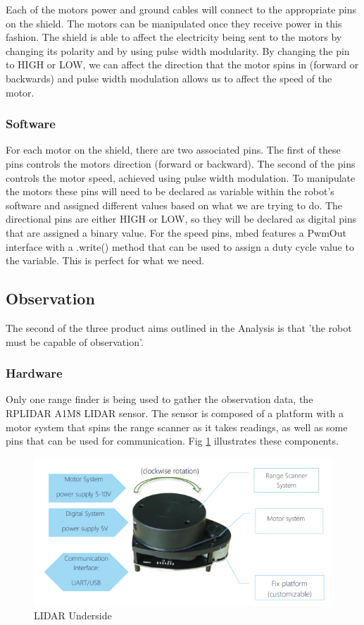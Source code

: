 				Each of the motors power and ground cables will connect to the appropriate pins on the shield. The motors can be manipulated once they receive power in this fashion. The shield is able to affect the electricity being sent to the motors by changing its polarity and by using pulse width modularity. By changing the pin to HIGH or LOW, we can affect the direction that the motor spins in (forward or backwards) and pulse width modulation allows us to affect the speed of the motor.
				
				\subsubsection{Software}
				For each motor on the shield, there are two associated pins. The first of these pins controls the motors direction (forward or backward). The second of the pins controls the motor speed,  achieved using pulse width modulation. To manipulate the motors these pins will need to be declared as variable within the robot's software and assigned different values based on what we are trying to do. The directional pins are either HIGH or LOW, so they will be declared as digital pins that are assigned a binary value. For the speed pins, mbed features a PwmOut interface with a .write() method that can be used to assign a duty cycle value to the variable. This is perfect for what we need.
				
			\subsection{Observation}
			The second of the three product aims outlined in the Analysis is that 'the robot must be capable of observation'.
				\subsubsection{Hardware}
				Only one range finder is being used to gather the observation data, the RPLIDAR A1M8 LIDAR sensor. The sensor is composed of a platform with a motor system that spins the range scanner as it takes readings, as well as some pins that can be used for communication. Fig \ref{fig:rplidarconfig} illustrates these components.
				
				\begin{figure}[h]
					\centering
					\includegraphics[width=.9\linewidth]{SYNTHESIS/rplidar_configuration.png}
					\caption{LIDAR Underside}
					\label{fig:rplidarconfig}
				\end{figure}
			
